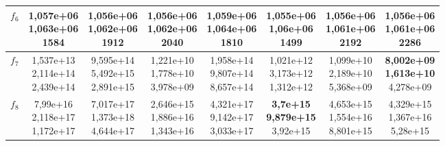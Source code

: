 \begin{table}[t]
\begin{small}
\begin{tabular}{|c|c|c|c|c|c|c|c|}
        $f_6$    & \makecell{1,057e+06 \\ 1,063e+06 \\ 1584}      & \makecell{1,056e+06 \\ 1,062e+06 \\ 1912}      & \makecell{1,056e+06 \\ 1,062e+06 \\ 2040}      & \makecell{1,059e+06 \\ 1,064e+06 \\ 1810}      & \makecell{\textbf{1,055e+06} \\ \textbf{1,06e+06} \\ 1499}       & \makecell{1,056e+06 \\ 1,061e+06 \\ 2192}      & \makecell{1,056e+06 \\ 1,061e+06 \\ 2286}      \\\hline
        $f_7$    & \makecell{1,537e+13 \\ 2,114e+14 \\ 2,439e+14} & \makecell{9,595e+14 \\ 5,492e+15 \\ 2,891e+15} & \makecell{1,221e+10 \\ 1,778e+10 \\ 3,978e+09} & \makecell{1,958e+14 \\ 9,807e+14 \\ 8,657e+14} & \makecell{1,021e+12 \\ 3,173e+12 \\ 1,312e+12} & \makecell{1,099e+10 \\ 2,189e+10 \\ 5,368e+09} & \makecell{\textbf{8,002e+09} \\ \textbf{1,613e+10} \\ 4,278e+09} \\\hline
        $f_8$    & \makecell{7,99e+16 \\ 2,118e+17 \\ 1,172e+17}  & \makecell{7,017e+17 \\ 1,373e+18 \\ 4,644e+17} & \makecell{2,646e+15 \\ 1,886e+16 \\ 1,343e+16} & \makecell{4,321e+17 \\ 9,142e+17 \\ 3,033e+17} & \makecell{\textbf{3,7e+15} \\ \textbf{9,879e+15} \\ 3,92e+15}    & \makecell{4,653e+15 \\ 1,554e+16 \\ 8,801e+15} & \makecell{4,329e+15 \\ 1,367e+16 \\ 5,28e+15} \\\hline

\end{tabular}
\end{small}
\end{table}
